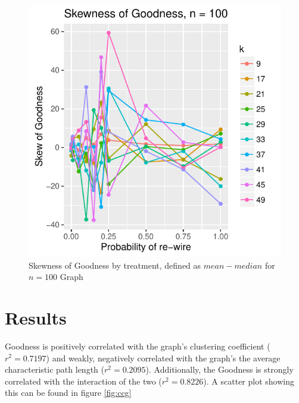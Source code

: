 \documentclass{article}
\begin{document}
\begin{figure}
\centering
\includegraphics[width=1\textwidth]{6-skewG_by_p_k_n100.pdf}
\caption{\label{fig:Gskew}Skewness of Goodness by treatment, defined as $mean-median$ for $n = 100$ Graph}
\end{figure}

\section{Results}
Goodness is positively correlated with the graph's clustering coefficient ($r^2 = 0.7197$) and weakly, negatively correlated with the graph's the average characteristic path length ($r^2 = 0.2095$). Additionally, the Goodness is strongly correlated with the interaction of the two ($r^2 = 0.8226$). A scatter plot showing this can be found in figure \ref{fig:ccg}
\end{document}
